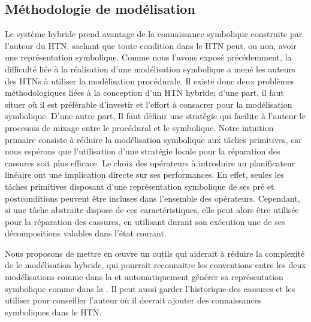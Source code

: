 \documentclass[a4paper,twoside,french]{article}
\begin{document}
		\subsection{Méthodologie de modélisation}
		Le système hybride prend avantage de la connaissance symbolique construite par l'auteur du HTN, sachant que toute condition  dans le HTN peut, ou non, avoir une représentation symbolique. Comme  nous l'avons exposé précédemment, la difficulté liée à la réalisation d'une modélisation symbolique a mené les auteurs des HTNs à utiliser la modélisation procédurale. Il existe donc deux problèmes méthodologiques liées à la conception d'un HTN hybride;  d'une part, il faut situer où il est préférable d'investir et l'effort à consacrer pour la modélisation symbolique. D'une autre part, Il faut définir une stratégie qui facilite à l'auteur le processus de mixage entre le procédural et le symbolique. Notre intuition primaire consiste à réduire la modélisation symbolique aux tâches primitives, car nous espérons que l'utilisation d'une stratégie locale pour la réparation des cassures soit plus efficace. Le choix des opérateurs à introduire au planificateur linéaire ont une implication directe sur ses performances. En effet, seules les tâches primitives disposant d'une représentation symbolique de ses pré et postconditions peuvent être incluses dans l'ensemble des opérateurs. Cependant, si une tâche abstraite dispose de ces caractéristiques, elle peut alors être  utilisée pour la réparation des cassures, en utilisant durant son exécution une de ses décompositions valables dans l'état courant. 
		\par Nous proposons de mettre en œuvre un outils qui aiderait à réduire la complexité de le modélisation hybride, qui pourrait reconnaitre les conventions entre les deux modélisations comme dans la  et automatiquement générer sa représentation symbolique comme dans la   . Il peut aussi garder l'historique des cassures et les utiliser pour conseiller l'auteur où il devrait ajouter des connaissances symboliques dans le HTN.
		
\end{document}
